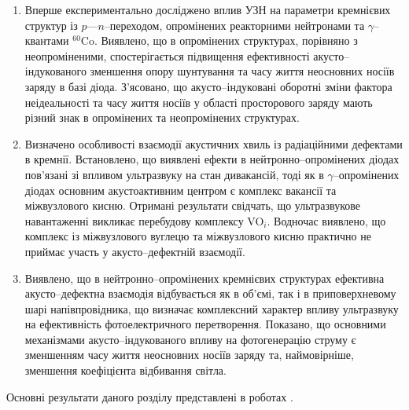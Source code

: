 \begin{enumerate}[leftmargin=0cm,itemindent=3em]
     \item Вперше експериментально досліджено вплив УЗН на параметри кремнієвих структур із $p$---$n$--переходом, опромінених  реакторними нейтронами та $\gamma$--квантами $^{60}$Co.
      Виявлено, що в опромінених структурах, порівняно з неопроміненими, спостерігається підвищення ефективності акусто--індукованого зменшення  опору шунтування та часу життя неосновних носіїв заряду в базі діода.
      З'ясовано, що акусто--індуковані оборотні зміни фактора неідеальності та часу життя носіїв у області просторового заряду   мають різний знак в опромінених та неопромінених структурах.

      \item Визначено особливості взаємодії акустичних хвиль із радіаційними дефектами в кремнії.
      Встановлено, що виявлені ефекти в нейтронно--опромінених діодах пов'язані зі впливом ультразвуку на стан дивакансій,  тоді як в $\gamma$--опромінених діодах основним акустоактивним центром є комплекс вакансії та міжвузлового кисню.
     Отримані результати свідчать, що ультразвукове навантаженні викликає перебудову комплексу VO$_i$.
     Водночас виявлено, що комплекс із міжвузлового вуглецю та міжвузлового кисню практично не приймає участь у
     акусто--дефектній взаємодії.


     \item Виявлено, що в нейтронно--опромінених кремнієвих структурах ефективна акусто--дефектна
     взаємодія відбувається як в об'ємі, так і в приповерхневому шарі напівпровідника, що
визначає комплексний характер впливу ультразвуку на ефективність фотоелектричного перетворення.
Показано, що основними механізмами акусто--індукованого впливу на фотогенерацію струму є зменшенням часу життя неосновних носіїв заряду та,
наймовірніше, зменшення коефіцієнта відбивання світла.
  \end{enumerate}	

Основні результати даного розділу представлені в роботах
\cite{Olikh:Visn2003,Olikh:MRS2007a,Olikh:SEMT2007,Olikh:FTP2009,Olikh:UPJ2010,Olikh:FTP2011,Olikh2018JAP,Olikh2018SM,
1SEMST,2005IUS,ICU2007SC,2007MRS,3UNCPS,2009DRIP13,6Drog,4UNCPS,4Kremen,6SEMST,2017MEICS}.



